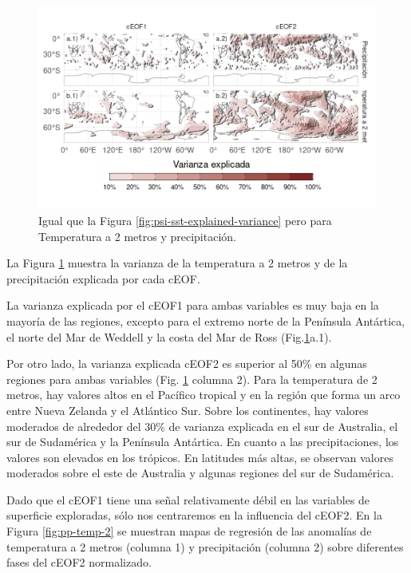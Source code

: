\documentclass[12pt,oneside]{reedthesis}
\begin{document}
\begin{figure}
\includegraphics{figures/20-ceofs/pp-t2m-r2-1} \caption{Igual que la Figura \ref{fig:psi-sst-explained-variance} pero para Temperatura a 2 metros y precipitación.}\label{fig:pp-t2m-r2}
\end{figure}



La Figura \ref{fig:pp-t2m-r2} muestra la varianza de la temperatura a 2 metros y de la precipitación explicada por cada cEOF.

La varianza explicada por el cEOF1 para ambas variables es muy baja en la mayoría de las regiones, excepto para el extremo norte de la Península Antártica, el norte del Mar de Weddell y la costa del Mar de Ross (Fig.\ref{fig:pp-t2m-r2}a.1).

Por otro lado, la varianza explicada cEOF2 es superior al 50\% en algunas regiones para ambas variables (Fig. \ref{fig:pp-t2m-r2} columna 2).
Para la temperatura de 2 metros, hay valores altos en el Pacífico tropical y en la región que forma un arco entre Nueva Zelanda y el Atlántico Sur.
Sobre los continentes, hay valores moderados de alrededor del 30\% de varianza explicada en el sur de Australia, el sur de Sudamérica y la Península Antártica.
En cuanto a las precipitaciones, los valores son elevados en los trópicos.
En latitudes más altas, se observan valores moderados sobre el este de Australia y algunas regiones del sur de Sudamérica.

Dado que el cEOF1 tiene una señal relativamente débil en las variables de superficie exploradas, sólo nos centraremos en la influencia del cEOF2.
En la Figura \ref{fig:pp-temp-2} se muestran mapas de regresión de las anomalías de temperatura a 2 metros (columna 1) y precipitación (columna 2) sobre diferentes fases del cEOF2 normalizado.
\end{document}
